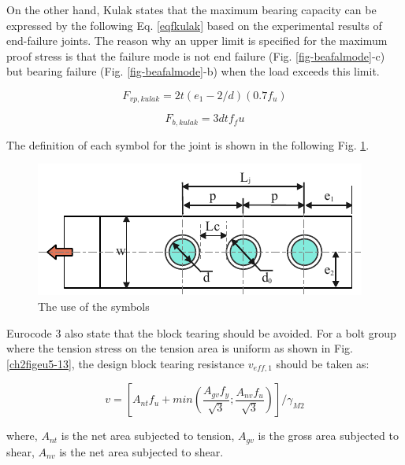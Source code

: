 On the other hand, Kulak \cite{Kulak1988guide} states that the maximum bearing capacity can be expressed by the following Eq. \ref{eqfkulak} based on the experimental results of end-failure joints. The reason why an upper limit is specified for the maximum proof stress is that the failure mode is not end failure (Fig. \ref{fig-beafalmode}-c) but bearing failure (Fig. \ref{fig-beafalmode}-b) when the load exceeds this limit.

\begin{equation}\label{eqfkulak}
    F_{vp,kulak}=2t(e_1-2/d)(0.7f_u)
\end{equation}

\begin{equation}
    F_{b,kulak}=3dtf_fu
\end{equation}

The definition of each symbol for the joint is shown in the following Fig. \ref{fig-symbol}.

\begin{figure}
    \centering
    \includegraphics[width=0.7\linewidth]{imgs//ch2/symbol.pdf}
    \caption{The use of the symbols}
    \label{fig-symbol}
\end{figure}

Eurocode 3 also state that the block tearing should be avoided. For a bolt group where the tension stress on the tension area is uniform as shown in Fig. \ref{ch2figeu5-13}, the design block tearing resistance $v_{eff,1}$ should be taken as:

\begin{equation}
    v=[A_{nt}f_u+min(\frac{A_{gv}f_y}{\sqrt{3}}; \frac{A_{nv}f_u}{\sqrt{3}})]/\gamma_{M2}
\end{equation}

where, $A_{nt}$ is the net area subjected to tension, $A_{gv}$ is the gross area subjected to shear, $A_{nv}$ is the net area subjected to shear.

